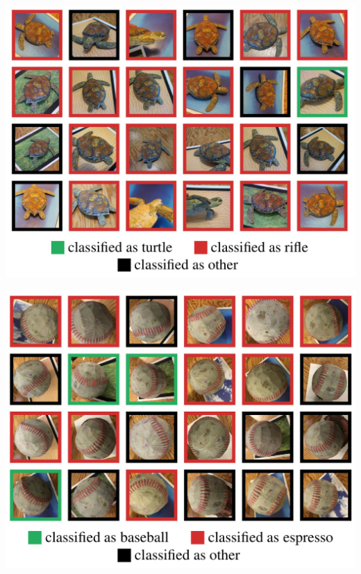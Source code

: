 \documentclass[aspectratio=169,x11names]{beamer}
\begin{document}
\begin{frame}
\begin{center}
\includegraphics[height=0.9\textheight,keepaspectratio]{images/turtle_class} 
\end{center}
\end{frame}

\begin{frame}
\begin{center}
\includegraphics[height=0.9\textheight,keepaspectratio]{images/baseball_class} 
\end{center}
\end{frame}
\end{document}
